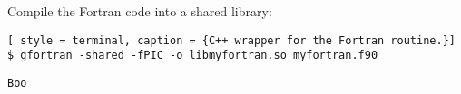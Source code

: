 \documentclass{article}
\begin{document}
Compile the Fortran code into a shared library:
\begin{lstlisting}[ style = terminal, caption = {C++ wrapper for the Fortran routine.}]
$ gfortran -shared -fPIC -o libmyfortran.so myfortran.f90
\end{lstlisting}

\begin{lstlisting}[style=terminal]
Boo
\end{lstlisting}
\end{document}
